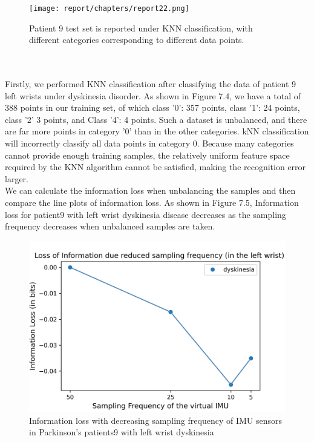 \begin{figure}[htbp]
\centering
\texttt{[image: report/chapters/report22.png]}
\caption{Patient 9 test set is reported under KNN classification, with different categories corresponding to different data points.}
\end{figure}


\\ \hspace*{\fill} \\
Firstly, we performed KNN classification after classifying the data of patient 9 left wrists under dyskinesia disorder. As shown in Figure 7.4, we have a total of 388 points in our training set, of which class '0': 357 points, class '1': 24 points, class '2' 3 points, and Class '4': 4 points. Such a dataset is unbalanced, and there are far more points in category '0' than in the other categories. kNN classification will incorrectly classify all data points in category 0. Because many categories cannot provide enough training samples, the relatively uniform feature space required by the KNN algorithm cannot be satisfied, making the recognition error larger.\\
We can calculate the information loss when unbalancing the samples and then compare the line plots of information loss. As shown in Figure 7.5, Information loss for patient9 with left wrist dyskinesia disease decreases as the sampling frequency decreases when unbalanced samples are taken.
\begin{figure}[htbp]
\centering
\includegraphics[width=12cm ]{report/pics/dyskinesia_leftwrist9-2.png}
\caption{Information loss with decreasing sampling frequency of IMU sensors in Parkinson's patients9 with left wrist dyskinesia}
\end{figure}\\


